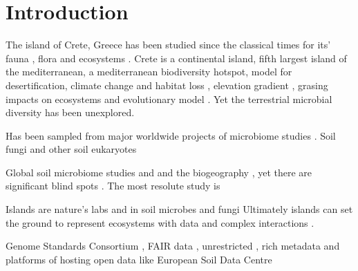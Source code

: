 \documentclass[unnumsec,webpdf,contemporary,large]{oup-authoring-template}%
\theoremstyle{thmstyleone}%
\theoremstyle{thmstyletwo}%
\theoremstyle{thmstylethree}%
\begin{document}


\maketitle


\section{Introduction}\label{intro}

The island of Crete, Greece has been studied since the classical times for its' fauna \citep{Sidiropoulos_Polymeni_Legakis_2017,Anastasiou2018Tenebrionid}, flora \citep{Krimbas_2005} and ecosystems \citep{Grove1993}.
Crete is a continental island, fifth largest island of the mediterranean, a mediterranean biodiversity hotspot, model for desertification, climate change \citep{Kougioumoutzis2020} and habitat loss \citep{ISPIKOUDIS1993259},
elevation gradient \citep{trigas2013, FAZAN2017}, grasing impacts on ecosystems \citep{JouffroyBapicot2016} and evolutionary model \citep{POULAKAKIS2002}.
Yet the terrestrial microbial diversity has been unexplored.

Has been sampled from major worldwide projects of microbiome studies \citep{Vasar2022, Labouyrie2023, Bahram2018, Orgiazzi2018}. Soil fungi \citep{Mikryukov2023, Davison2021, Tedersoo2021} and other soil eukaryotes \citep{Aslani2022}

Global soil microbiome studies \citep{Delgado-Baquerizo2018} and \citep{Bahram2018} and the biogeography \citep{Martiny2006} \citep{Guerra2020}, \citep{Labouyrie2023} yet there are significant blind spots \citep{Guerra2020}. The most resolute study is \citep{Karimi2020}

Islands are nature's labs \citep{Whittaker2017} and in soil microbes \citep{Li2020} and fungi \citep{Delavaux2021}
Ultimately islands can set the ground to represent ecosystems with data and complex interactions \citep{Davies2016}.


Genome Standards Consortium \citep{Field2011}, FAIR data \citep{Wilkinson2016}, unrestricted \citep{Amann2019},
rich metadata and platforms of hosting open data like European Soil Data Centre \citep{Panagos2022}
\end{document}
